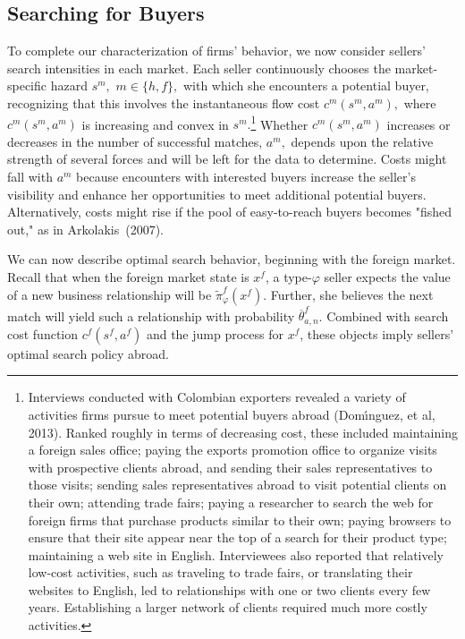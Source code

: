 \documentclass[12pt]{article}
\begin{document}
\subsection{Searching for Buyers}

To complete our characterization of firms' behavior, we now consider
sellers' search intensities in each market. Each seller continuously chooses
the market-specific hazard $s^{m},$ $m\in \{h,f\},$ with which she
encounters a potential buyer, recognizing that this involves the
instantaneous flow cost $c^{m}(s^{m},a^{m}),$ where $c^{m}(s^{m},a^{m})$ is
increasing and convex in $s^{m}.$\footnote{%
Interviews conducted with Colombian exporters revealed a variety of
activities firms pursue to meet potential buyers abroad (Dom\'{\i}nguez, et
al, 2013). Ranked roughly in terms of decreasing cost, these included
maintaining a foreign sales office; paying the exports promotion office to
organize visits with prospective clients abroad, and sending their sales
representatives to those visits; sending sales representatives abroad to
visit potential clients on their own; attending trade fairs; paying a
researcher to search the web for foreign firms that purchase products
similar to their own; paying browsers to ensure that their site appear near
the top of a search for their product type; maintaining a web site in
English. Interviewees also reported that relatively low-cost activities,
such as traveling to trade fairs, or translating their websites to English,
led to relationships with one or two clients every few years. Establishing a
larger network of clients required much more costly activities.} Whether $%
c^{m}(s^{m},a^{m})$ increases or decreases in the number of successful
matches, $a^{m},$ depends upon the relative strength of several forces and
will be left for the data to determine. Costs might fall with $a^{m}$
because encounters with interested buyers increase the seller's visibility
and enhance her opportunities to meet additional potential buyers.
Alternatively, costs might rise if the pool of easy-to-reach buyers becomes
"fished out," as in Arkolakis\ (2007).

We can now describe optimal search behavior, beginning with the foreign
market. Recall that when the foreign market state is $x^{f}$, a type-$%
\varphi $ seller expects the value of a new business relationship will be $%
\widetilde{\pi }_{\varphi }^{f}(x^{f}).$ Further, she believes the next
match will yield such a relationship with probability $\overline{\theta }%
_{a,n}^{f}$. Combined with search cost function $c^{f}(s^{f},a^{f})$ and the
jump process for $x^{f}$, these objects imply sellers' optimal search policy
abroad.
\end{document}
